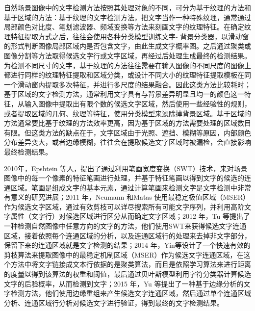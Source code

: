     自然场景图像中的文字检测方法按照其处理对象的不同，可分为基于纹理的方法和基于区域的方法：基于纹理的文字检测方法，把文字当作一种特殊纹理，通常通过局部颜色对比度、笔划滤波器、频域变换等方法来刻画文字的纹理特征。在确定纹理特征提取方式之后，往往会使用各种分类模型训练文字- 背景分类器，以滑动窗的形式判断图像局部区域内是否包含文字，由此生成文字概率图。之后通过聚类或图像分割等方法取得候选文字行或文字区域，再经过后处理生成最终的检测结果。为检测不同尺寸的文字，基于纹理的方法往往需要在输入图像的不同尺度的图像上都进行同样的纹理特征提取和区域分类，或设计不同大小的纹理特征提取模板在同一个滑动窗内提取多次特征，并进行多尺度的结果融合。因此这类方法比较耗时；基于区域的文字检测方法，通常利用文字具有与背景差异明显且均一的颜色这一特征，从输入图像中提取出有限个数的候选文字区域，然后使用一些经验性的规则，或者提取区域的几何、纹理等特征，使用分类模型来滤除掉背景区域。基于区域的方法通常要比基于纹理的方法效率更高，因为基于区域的方法需要处理的区域数目有限。但这类方法的缺点在于，文字区域由于光照、遮挡、模糊等原因，内部颜色分布差异变大，或者边缘模糊，往往会在提取候选文字区域时被漏检，会直接影响最终检测结果。

    2010年，Epshtein\cite{Epshtein2010Detecting} 等人，提出了通过利用笔画宽度变换（SWT）技术，来对场景图像中的每一个像素的特征笔画进行处理，并基于特征笔画以得到文字的候选的连通区域。笔画是组成文字的基本元素，通过计算笔画来检测文字是文字检测中非常有意义的研究进展；2011 年，Neumann 和Matas\cite{Neumann2011Text} 使用最稳定极值区域（MSER）作为候选文字区域，通过有效剪枝可以详尽搜索所有可能文字序列，并利用高阶文字属性（文字行）对候选区域进行区分从而确定文字区域；2012 年，Tu\cite{Tu2012Detecting} 等提出了一种检测自然图像中任意方向的文字的方法，他们使用SWT来获得候选文字连通区域，接着依照每个连通区域的分析，以及连通区域行的处理来去掉非文字部分，保留下来的连通区域就是文字检测的结果；2014 年，Yin\cite{Yin2013Robust}等设计了一个快速有效的剪枝算法来提取图像中的最稳定机制区域（MSER）作为候选文字连通区域，在这个方法中将文字链接成文本行依据的是聚类算法，而且是依照学习算法来进行距离的度量以得到该算法的权重和阈值，最后通过贝叶斯模型利用字符分类器计算候选文字的后验概率，从而检测到文字；2015 年，Yu\cite{Yu2015Text} 等提出了一种基于边缘分析的文字检测方法，他们使用边缘重组来产生候选文字连通区域，然后通过单个连通区域分析、连通区域行分析对候选文字进行验证，得到最终的文字检测结果。

